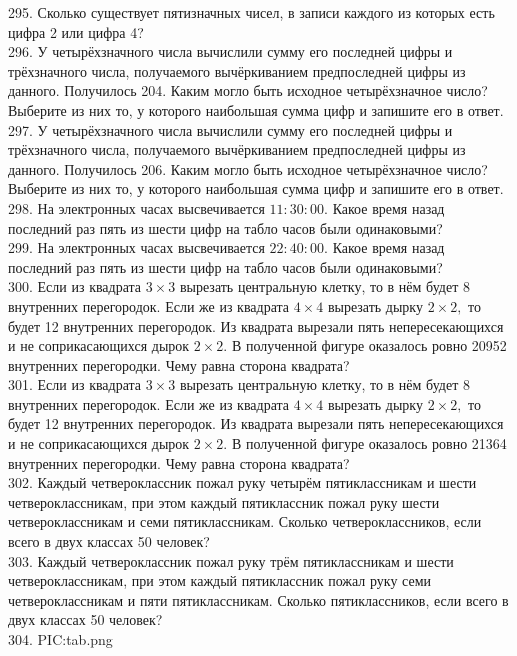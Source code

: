 295. Сколько существует пятизначных чисел, в записи каждого из которых есть цифра 2 или цифра 4?\\
296. У четырёхзначного числа вычислили сумму его последней цифры и трёхзначного числа, получаемого вычёркиванием предпоследней цифры из данного. Получилось 204. Каким могло быть исходное четырёхзначное число? Выберите из них то, у которого наибольшая сумма цифр и запишите его в ответ.\\
297. У четырёхзначного числа вычислили сумму его последней цифры и трёхзначного числа, получаемого вычёркиванием предпоследней цифры из данного. Получилось 206. Каким могло быть исходное четырёхзначное число? Выберите из них то, у которого наибольшая сумма цифр и запишите его в ответ.\\
298. На электронных часах высвечивается $11:30:00.$ Какое время назад последний раз пять из шести цифр на табло часов были одинаковыми?\\
299. На электронных часах высвечивается $22:40:00.$ Какое время назад последний раз пять из шести цифр на табло часов были одинаковыми?\\
300. Если из квадрата $3\times3$ вырезать центральную клетку, то в нём будет 8 внутренних перегородок. Если же из квадрата $4\times4$ вырезать дырку $2\times2,$ то будет 12 внутренних перегородок. Из квадрата вырезали пять непересекающихся и не соприкасающихся дырок $2\times2.$ В полученной фигуре оказалось ровно 20952 внутренних перегородки. Чему равна сторона квадрата?\\
301. Если из квадрата $3\times3$ вырезать центральную клетку, то в нём будет 8 внутренних перегородок. Если же из квадрата $4\times4$ вырезать дырку $2\times2,$ то будет 12 внутренних перегородок. Из квадрата вырезали пять непересекающихся и не соприкасающихся дырок $2\times2.$ В полученной фигуре оказалось ровно 21364 внутренних перегородки. Чему равна сторона квадрата?\\
302. Каждый четвероклассник пожал руку четырём пятиклассникам и шести четвероклассникам, при этом каждый пятиклассник пожал руку шести четвероклассникам и семи пятиклассникам. Сколько четвероклассников, если всего в двух классах 50 человек?\\
303. Каждый четвероклассник пожал руку трём пятиклассникам и шести четвероклассникам, при этом каждый пятиклассник пожал руку семи четвероклассникам и пяти пятиклассникам. Сколько пятиклассников, если всего в двух классах 50 человек?\\
304. {{PIC:tab.png}}\\
